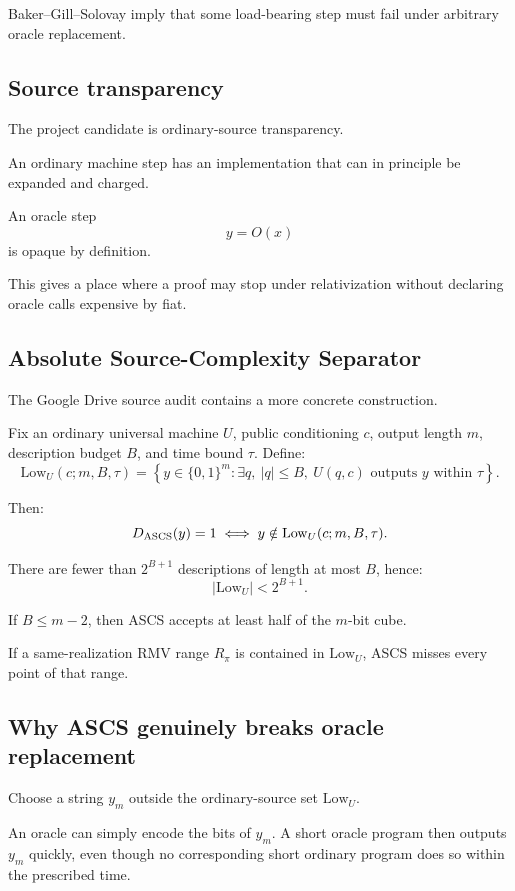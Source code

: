 \documentclass[11pt]{article}
\theoremstyle{plain}
\theoremstyle{definition}
\theoremstyle{remark}
\begin{document}
Baker--Gill--Solovay imply that some load-bearing step must fail under arbitrary
oracle replacement.

\subsection{Source transparency}

The project candidate is ordinary-source transparency.

An ordinary machine step has an implementation that can in principle be
expanded and charged.

An oracle step
\[
y=O(x)
\]
is opaque by definition.

This gives a place where a proof may stop under relativization without
declaring oracle calls expensive by fiat.

\subsection{Absolute Source-Complexity Separator}

The Google Drive source audit contains a more concrete construction.

Fix an ordinary universal machine \(U\), public conditioning \(c\), output
length \(m\), description budget \(B\), and time bound \(\tau\).  Define:
\[
\mathrm{Low}_U(c;m,B,\tau)
=
\left\{
y\in\{0,1\}^m:
\exists q,\ |q|\le B,\ U(q,c)\text{ outputs }y\text{ within }\tau
\right\}.
\]

Then:
\[
D_{\rm ASCS}(y)=1
\iff
y\notin\mathrm{Low}_U(c;m,B,\tau).
\]

There are fewer than \(2^{B+1}\) descriptions of length at most \(B\), hence:
\[
\boxed{
|\mathrm{Low}_U|<2^{B+1}.
}
\]

If \(B\le m-2\), then ASCS accepts at least half of the \(m\)-bit cube.

If a same-realization RMV range \(R_\pi\) is contained in
\(\mathrm{Low}_U\), ASCS misses every point of that range.

\subsection{Why ASCS genuinely breaks oracle replacement}

Choose a string \(y_m\) outside the ordinary-source set
\(\mathrm{Low}_U\).

An oracle can simply encode the bits of \(y_m\).  A short oracle program then
outputs \(y_m\) quickly, even though no corresponding short ordinary program
does so within the prescribed time.
\end{document}
